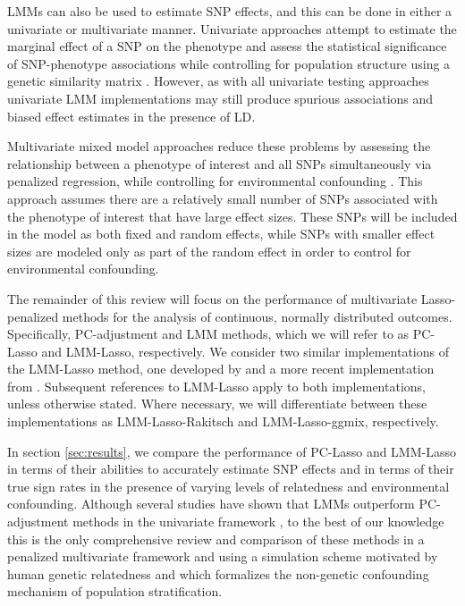 LMMs can also be used to estimate SNP effects, and this can be done in either a univariate or multivariate manner. Univariate approaches attempt to estimate the marginal effect of a SNP on the phenotype and assess the statistical significance of SNP-phenotype associations while controlling for population structure using a genetic similarity matrix \cite{yu2006unified, kang2010variance, kang2008efficient}. However, as with all univariate testing approaches univariate LMM implementations may still produce spurious associations and biased effect estimates in the presence of LD. 

Multivariate mixed model approaches reduce these problems by assessing the relationship between a phenotype of interest and all SNPs simultaneously via penalized regression, while controlling for environmental confounding  \cite{Rakitsch2012, bhatnagar2019simultaneous}. This approach assumes there are a relatively small number of SNPs associated with the phenotype of interest that have large effect sizes. These SNPs will be included in the model as both fixed and random effects, while SNPs with smaller effect sizes are modeled only as part of the random effect in order to control for environmental confounding. 

The remainder of this review will focus on the performance of multivariate Lasso-penalized methods for the analysis of continuous, normally distributed outcomes. Specifically, PC-adjustment and LMM methods, which we will refer to as PC-Lasso and LMM-Lasso, respectively. We consider two similar implementations of the LMM-Lasso method, one developed by \cite{Rakitsch2012} and a more recent implementation from \cite{bhatnagar2019simultaneous}. Subsequent references to LMM-Lasso apply to both implementations, unless otherwise stated. Where necessary, we will differentiate between these implementations as LMM-Lasso-Rakitsch and LMM-Lasso-ggmix, respectively. 

In section \ref{sec:results}, we compare the performance of PC-Lasso and LMM-Lasso in terms of their abilities to accurately estimate SNP effects and in terms of their true sign rates in the presence of varying levels of relatedness and environmental confounding. Although several studies have shown that LMMs outperform PC-adjustment methods in the univariate framework \cite{wang2013analytical, kang2010variance, zhao2007arabidopsis}, to the best of our knowledge this is the only comprehensive review and comparison of these methods in a penalized multivariate framework and using a simulation scheme motivated by human genetic relatedness and which formalizes the non-genetic confounding mechanism of population stratification.\\

